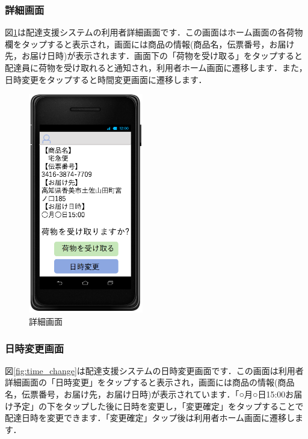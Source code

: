 \documentclass[a4j,titlepage]{jarticle}
\begin{document}
\subsubsection{詳細画面}
図\ref{fig:user_details}は配達支援システムの利用者詳細画面です．この画面はホーム画面の各荷物欄をタップすると表示され，画面には商品の情報(商品名，伝票番号，お届け先，お届け日時)が表示されます．画面下の「荷物を受け取る」をタップすると配達員に荷物を受け取れると通知され，利用者ホーム画面に遷移します．また，日時変更をタップすると時間変更画面に遷移します．
\begin{figure}[H]
 \begin{center}
  \includegraphics[width=50mm]{user_details.png}
	\caption{詳細画面}
	\label{fig:user_details}
 \end{center}

\end{figure}
\newpage
\subsubsection{日時変更画面}
図\ref{fig:time_change}は配達支援システムの日時変更画面です．この画面は利用者詳細画面の「日時変更」をタップすると表示され，画面には商品の情報(商品名，伝票番号，お届け先，お届け日時)が表示されています．「○月○日15:00お届け予定」の下をタップした後に日時を変更し，「変更確定」をタップすることで配達日時を変更できます．「変更確定」タップ後は利用者ホーム画面に遷移します．
\end{document}
